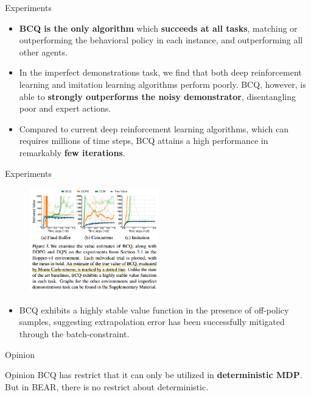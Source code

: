 \documentclass[11pt]{beamer}
\newcommand{\tb}[1]{\textbf{#1}}
\begin{document}
\begin{frame}{Experiments}
    \smallskip
    \begin{itemize}
        \item \tb{BCQ is the only algorithm} which \tb{succeeds at all tasks}, matching or outperforming the behavioral policy in each instance, and outperforming all other agents.
        \item In the imperfect demonstrations task, we find that both deep reinforcement learning and imitation learning algorithms perform poorly. BCQ, however, is able to \tb{strongly outperforms the noisy demonstrator}, disentangling poor and expert actions.
        \item Compared to current deep reinforcement learning algorithms, which can requires millions of time steps, BCQ attains a high performance in remarkably \tb{few iterations}.
    \end{itemize}
\end{frame}

\begin{frame}{Experiments}
    \begin{figure}
        \centering
        \includegraphics[width=0.5\textwidth]{figure3.png}
        \vfill
    \end{figure}

    \begin{itemize}
        \item BCQ exhibits a highly stable value function in the presence of off-policy samples, suggesting extrapolation error has been successfully mitigated through the batch-constraint.
    \end{itemize}
\end{frame}

\begin{frame}{Opinion}
    \begin{block}{Opinion}
        BCQ has restrict that it can only be utilized in \tb{deterministic MDP}. But in BEAR, there is no restrict about deterministic.
    \end{block}
\end{frame}
\end{document}
